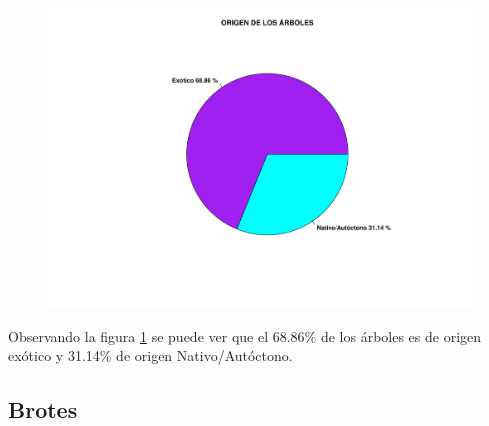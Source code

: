 \documentclass[11pt]{article}
\begin{document}
\begin{figure}[h!]
  \begin{center}
    \includegraphics[width=0.9\linewidth]{pieOrigen.pdf}
    \caption{}
    \label{fig:pieOrigen}
  \end{center}
\end{figure}

\begin{justify}
  Observando la figura \ref{fig:pieOrigen} se puede ver que el 68.86\% de los
  árboles es de origen exótico y 31.14\% de origen Nativo/Autóctono.
\end{justify}


\newpage
\subsection{Brotes}
\end{document}
